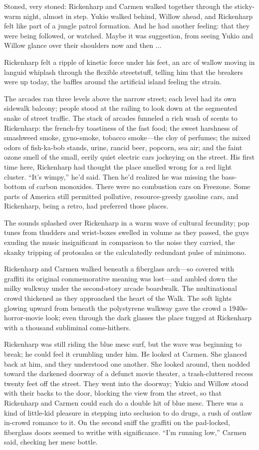 Stoned, very stoned: Rickenharp and Carmen walked together through the sticky-warm night, almost in step. Yukio walked behind, Willow ahead, and Rickenharp felt like part of a jungle patrol formation. And he had another feeling: that they were being followed, or watched. Maybe it was suggestion, from seeing Yukio and Willow glance over their shoulders now and then ...

Rickenharp felt a ripple of kinetic force under his feet, an arc of wallow moving in languid whiplash through the flexible streetstuff, telling him that the breakers were up today, the baffles around the artificial island feeling the strain.

The arcades ran three levels above the narrow street; each level had its own sidewalk balcony; people stood at the railing to look down at the segmented snake of street traffic. The stack of arcades funneled a rich wash of scents to Rickenharp: the french-fry toastiness of the fast food; the sweet harshness of smashweed smoke, gyno-smoke, tobacco smoke---the cloy of perfumes; the mixed odors of fish-ka-bob stands, urine, rancid beer, popcorn, sea air; and the faint ozone smell of the small, eerily quiet electric cars jockeying on the street. His first time here, Rickenharp had thought the place smelled wrong for a red light cluster. ``It's wimpy,'' he'd said. Then he'd realized he was missing the bass-bottom of carbon monoxides. There were no combustion cars on Freezone. Some parts of America still permitted pollutive, resource-greedy gasoline cars, and Rickenharp, being a retro, had preferred those places.

The sounds splashed over Rickenharp in a warm wave of cultural fecundity; pop tunes from thudders and wrist-boxes swelled in volume as they passed, the guys exuding the music insignificant in comparison to the noise they carried, the skanky tripping of protosalsa or the calculatedly redundant pulse of minimono.

Rickenharp and Carmen walked beneath a fiberglass arch---so covered with graffiti its original commemorative meaning was lost---and ambled down the milky walkway under the second-story arcade boardwalk. The multinational crowd thickened as they approached the heart of the Walk. The soft lights glowing upward from beneath the polystyrene walkway gave the crowd a 1940s-horror-movie look; even through the dark glasses the place tugged at Rickenharp with a thousand subliminal come-hithers.

Rickenharp was still riding the blue mesc surf, but the wave was beginning to break; he could feel it crumbling under him. He looked at Carmen. She glanced back at him, and they understood one another. She looked around, then nodded toward the darkened doorway of a defunct movie theater, a trash-cluttered recess twenty feet off the street. They went into the doorway; Yukio and Willow stood with their backs to the door, blocking the view from the street, so that Rickenharp and Carmen could each do a double hit of blue mesc. There was a kind of little-kid pleasure in stepping into seclusion to do drugs, a rush of outlaw in-crowd romance to it. On the second sniff the graffiti on the pad-locked, fiberglass doors seemed to writhe with significance. ``I'm running low,'' Carmen said, checking her mesc bottle.

